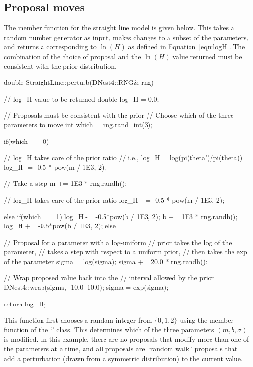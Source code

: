\documentclass[article]{jss}
\begin{document}
\subsection{Proposal moves}\label{sec:perturb}
The  member function for the straight line model is given below.
This takes a random number generator as input, makes changes to
a subset of the parameters, and returns a  corresponding
to $\ln(H)$ as defined in Equation~\ref{eqn:logH}. The combination of
the choice of proposal and the $\ln(H)$ value returned must be consistent
with the prior distribution.
%
\begin{CodeChunk}
\begin{CodeInput}
double StraightLine::perturb(DNest4::RNG& rng)
{
    // log_H value to be returned
    double log_H = 0.0;

    // Proposals must be consistent with the prior
    // Choose which of the three parameters to move
    int which = rng.rand_int(3);

    if(which == 0)
    {
        // log_H takes care of the prior ratio
        // i.e., log_H = log(pi(theta')/pi(theta))
        log_H -= -0.5 * pow(m / 1E3, 2);

        // Take a step
        m += 1E3 * rng.randh();

        // log_H takes care of the prior ratio
        log_H += -0.5 * pow(m / 1E3, 2);
    }
    else if(which == 1)
    {
        log_H -= -0.5*pow(b / 1E3, 2);
        b += 1E3 * rng.randh();
        log_H += -0.5*pow(b / 1E3, 2);
    }
    else
    {
        // Proposal for a parameter with a log-uniform
        // prior takes the log of the parameter,
        // takes a step with respect to a uniform prior,
        // then takes the exp of the parameter
        sigma = log(sigma);
        sigma += 20.0 * rng.randh();

        // Wrap proposed value back into the
        // interval allowed by the prior
        DNest4::wrap(sigma, -10.0, 10.0);
        sigma = exp(sigma);
    }

    return log_H;
}
\end{CodeInput}
\end{CodeChunk}
%
This function first chooses a random integer from $\{0, 1, 2\}$ using the
 member function of the `' class.
This determines which of the three parameters
$(m, b, \sigma)$ is modified. In this example, there are no proposals
that modify more than one of the parameters at a time, and all proposals
are ``random walk'' proposals that add a perturbation
(drawn from a symmetric distribution) to the current value.
\end{document}
